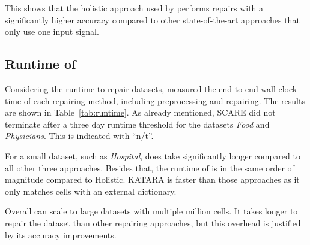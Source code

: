   This shows that the holistic approach used by \holoclean{} performs repairs with a significantly higher accuracy compared to other state-of-the-art approaches that only use one input signal.

  \subsection{Runtime of \holoclean{}}
  Considering the runtime to repair datasets, \citeauthor{holoclean} measured the end-to-end wall-clock time of each repairing method, including preprocessing and repairing.
  The results are shown in Table~\ref{tab:runtime}.
  As already mentioned, SCARE did not terminate after a three day runtime threshold for the datasets \textit{Food} and \textit{Physicians}.
  This is indicated with \enquote{n/t}.

  \begin{table}
    \caption{Runtime of \holoclean{} compared to other approaches. Obtained from~\cite{holoclean}}
    \label{tab:runtime}
  \end{table}

  For a small dataset, such as \textit{Hospital}, \holoclean{} does take significantly longer compared to all other three approaches.
  Besides that, the runtime of \holoclean{} is in the same order of magnitude compared to Holistic.
  KATARA is faster than those approaches as it only matches cells with an external dictionary.

  Overall \holoclean{} can scale to large datasets with multiple million cells.
  It takes longer to repair the dataset than other repairing approaches, but this overhead is justified by its accuracy improvements.

